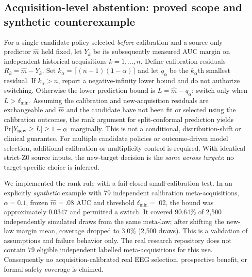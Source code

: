 \subsection{Acquisition-level abstention: proved scope and synthetic counterexample}
For a single candidate policy selected \emph{before} calibration and a
source-only predictor $\widehat m$ held fixed, let $Y_k$
be its subsequently measured AUC margin on independent historical
acquisitions $k=1,\ldots,n$. Define calibration residuals
$R_k=\widehat m-Y_k$. Set
$k_\alpha=\lceil(n+1)(1-\alpha)\rceil$ and let
$q_\alpha$ be the $k_\alpha$th smallest residual.
If $k_\alpha>n$, report a negative-infinity lower bound and
do not authorize switching. Otherwise the lower prediction bound is
$L=\widehat m-q_\alpha$; switch only when $L>\delta_{\min}$.
Assuming the calibration and new-acquisition residuals are
exchangeable and $\widehat m$ and the candidate have not been fit or
selected using the calibration outcomes, the rank argument for
split-conformal prediction yields
$\Pr[Y_{\rm new}\ge L]\ge 1-\alpha$ marginally.
This is not a conditional, distribution-shift or clinical guarantee.
For multiple candidate policies or outcome-driven model selection,
additional calibration or multiplicity control is required.
With identical strict-Z0 source inputs, the new-target decision is
the \emph{same across targets}: no target-specific choice is inferred.

We implemented the rank rule with a fail-closed small-calibration
test. In an explicitly \emph{synthetic} example with 79 independent
calibration meta-acquisitions, $\alpha=0.1$, frozen
$\widehat m=.08$ AUC and threshold $\delta_{\min}=.02$,
the bound was approximately $0.0347$ and permitted a switch.
It covered 90.64\% of 2,500 independently simulated draws from
the same meta-law; after shifting the new-law margin mean,
coverage dropped to 3.0\% (2,500 draws).
This is a validation of assumptions and failure behavior only.
The real research repository does not contain 79 eligible
independent labelled meta-acquisitions for this use.
Consequently no acquisition-calibrated real EEG selection,
prospective benefit, or formal safety coverage is claimed.
